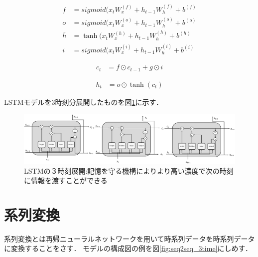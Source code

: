 \documentclass[a4j,11pt,report]{jsbook}
\begin{document}
\begin{equation}
  \label{eq:all}
  \begin{split}
    f &= sigmoid(x_{t}W_{x}^{(f)} + h_{t-1}W_{h}^{(f)} + b^{(f)} \\
    o &= sigmoid(x_{t}W_{x}^{(o)} + h_{t-1}W_{h}^{(o)} + b^{(o)} \\
    \bar{h} &= \tanh(x_{t}W_{x}^{(h)} + h_{t-1}W_{h}^{(h)} + b^{(h)} \\
    i &= sigmoid(x_{t}W_{x}^{(i)} + h_{t-1}W_{h}^{(i)} + b^{(i)}
  \end{split}
\end{equation}

\begin{equation}
  \label{eq:all2}
  \begin{split}
    c_{t} &= f \odot c_{t-1} + g \odot i
  \end{split}
\end{equation}

\begin{equation}
  \label{eq:all3}
  \begin{split}
    h_{t} &= o \odot \tanh(c_{t})
  \end{split}
\end{equation}

LSTMモデルを3時刻分展開したものを図\ref{fig:LSTM_3timeconcat}に示す．

\begin{center}
  \begin{figure}
    \centering
    \includegraphics[width=\linewidth]{image/LSTM_concat.png}
    \caption{LSTMの３時刻展開:記憶を守る機構によりより高い濃度で次の時刻に情報を渡すことができる}
    \label{fig:LSTM_3timeconcat}
  \end{figure}
\end{center}






\chapter{系列変換\label{ch:Seq2Seq}}

系列変換とは再帰ニューラルネットワークを用いて時系列データを時系列データに変換することをさす．
モデルの構成図の例を図\ref{fig:seq2seq_3time}にしめす．
\end{document}
